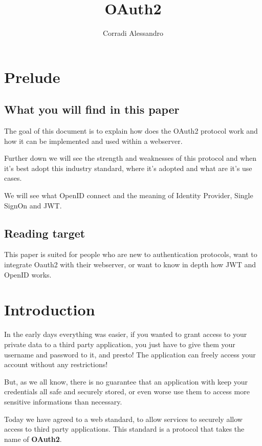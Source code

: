 \documentclass[11pt]{style}
\title{OAuth2}
\author{Corradi Alessandro}
\begin{document}
\maketitle{}
\tableofcontents
\clearpage
{}


\section{Prelude}
\subsection{What you will find in this paper}
The goal of this document is to explain how does the OAuth2 protocol work and
how it can be implemented and used within a webserver.

Further down we will see the strength and weaknesses of this protocol and when
it's best adopt this industry standard, where it's adopted and what are it's use
cases.

We will see what OpenID connect and the meaning of Identity Provider, Single SignOn
and JWT.
\subsection{Reading target}
This paper is suited for people who are new to authentication protocols, want to
integrate Oauth2 with their webserver, or want to know in depth how JWT and
OpenID works.

\section{Introduction}
In the early days everything was easier, if you wanted to grant access to your
private data to a third party application, you just have to give them your
username and password to it, and presto! The application can freely access your
account without any restrictions!

But, as we all know, there is no guarantee that an application with keep your
credentials all safe and securely stored, or even worse use them to access more
sensitive informations than necessary.

Today we have agreed to a web standard, to allow services to securely allow
access to third party applications.
This standard is a protocol that takes the name of \textbf{OAuth2}.
\end{document}

